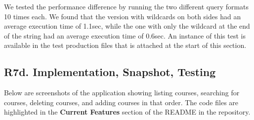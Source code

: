 \documentclass[12pt, a4paper]{article}
\begin{document}
We tested the performance difference by running the two different query formats 10 times each. We found that the version with wildcards on both sides had an average execution time of 1.1sec, while the one with only the wildcard at the end of the string had an average execution time of 0.6sec. An instance of this test is available in the test production files that is attached at the start of this section.
\subsection*{R7d. Implementation, Snapshot, Testing}
Below are screenshots of the application showing listing courses, searching for courses, deleting courses, and adding courses in that order.
The code files are highlighted in the \textbf{Current Features} section of the README in the repository.
\end{document}
